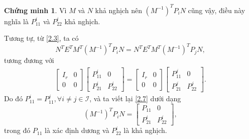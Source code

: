 \documentclass[12pt,a4paper]{report}
\theoremstyle{definition}
\newtheorem*{cv}{Chứng minh}
\theoremstyle{definition}
\numberwithin{dl}{chapter}
\numberwithin{vd}{chapter}
\numberwithin{corollary}{chapter}
\numberwithin{lemma}{chapter}
\numberwithin{md}{chapter}
\numberwithin{dn}{chapter}
\numberwithin{cy}{chapter}
\numberwithin{nx}{chapter}
\begin{document}
\begin{cv}
Vì $M$ và $N$ khả nghịch nên $\left(M^{-1}\right)^{T} P_{i} N$ cũng vậy, điều này nghĩa là $P_{11}^{i}$ và $P_{22}^{i}$ khả nghịch.

Tương tự, từ \eqref{2.3}, ta có
\begin{equation}\label{2.8}
N^{T} E^{T} M^{T}\left(M^{-1}\right)^{T} P_{i} N=N^{T} E^{T} M^{T}\left(M^{-1}\right)^{T} P_{j} N ,
\end{equation}
tương đương với
\begin{equation}\label{2.9}
\begin{gathered}
{\left[\begin{array}{cc}
I_{r} & 0 \\
0 & 0
\end{array}\right]\left[\begin{array}{cc}
P_{11}^{i} & 0 \\
P_{21}^{i} & P_{22}^{i}
\end{array}\right]}
=\left[\begin{array}{cc}
I_{r} & 0 \\
0 & 0
\end{array}\right]\left[\begin{array}{cc}
P_{11}^{j} & 0 \\
P_{21}^{j} & P_{22}^{j}
\end{array}\right] .
\end{gathered}
\end{equation}
Do đó $P_{11}^{i}=P_{11}^{j}, \forall i \neq j \in \mathcal{I}$, và ta viết lại \eqref{2.7} dưới dạng
\begin{equation}\label{2.10}
\left(M^{-1}\right)^{T} P_{i} N=\left[\begin{array}{cc}
P_{11} & 0 \\
P_{21}^{i} & P_{22}^{i}
\end{array}\right],
\end{equation}
trong đó $P_{11}$ là xác định dương và $P_{22}^{i}$ là khả nghịch.


\end{cv}
\end{document}
